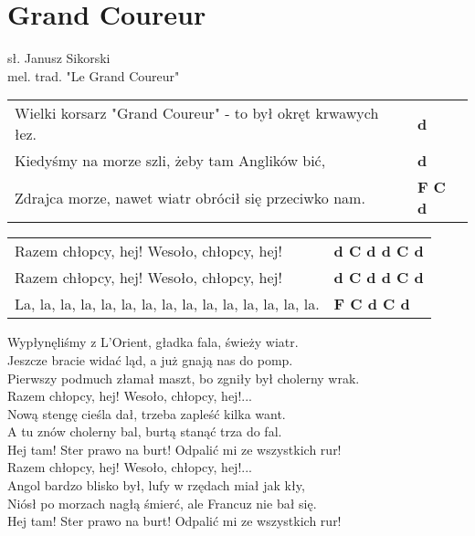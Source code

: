 \section{Grand Coureur}

sł. Janusz Sikorski\\
mel. trad. "Le Grand Coureur"

\vspace{2em}
\begin{tabular}{@{}p{10cm}@{}l@{}}
Wielki korsarz "Grand Coureur" - to był okręt krwawych łez. & \bfseries d\\
Kiedyśmy na morze szli, żeby tam Anglików bić, & \bfseries d\\
Zdrajca morze, nawet wiatr obrócił się przeciwko nam. & \bfseries F C d\\
\end{tabular}

\begin{tabular}{@{}p{10cm}@{}l@{}}
Razem chłopcy, hej! Wesoło, chłopcy, hej! & \bfseries d C d d C d\\
Razem chłopcy, hej! Wesoło, chłopcy, hej! & \bfseries d C d d C d\\
La, la, la, la, la, la, la, la, la, la, la, la, la, la, la. & \bfseries F C d C d\\
\end{tabular}

\vspace{1em}
Wypłynęliśmy z L'Orient, gładka fala, świeży wiatr. \\
Jeszcze bracie widać ląd, a już gnają nas do pomp. \\
Pierwszy podmuch złamał maszt, bo zgniły był cholerny wrak. \\

Razem chłopcy, hej! Wesoło, chłopcy, hej!... \\

Nową stengę cieśla dał, trzeba zapleść kilka want. \\
A tu znów cholerny bal, burtą stanąć trza do fal. \\
Hej tam! Ster prawo na burt! Odpalić mi ze wszystkich rur! \\

Razem chłopcy, hej! Wesoło, chłopcy, hej!... \\

Angol bardzo blisko był, lufy w rzędach miał jak kły, \\
Niósł po morzach nagłą śmierć, ale Francuz nie bał się. \\
Hej tam! Ster prawo na burt! Odpalić mi ze wszystkich rur! \\

